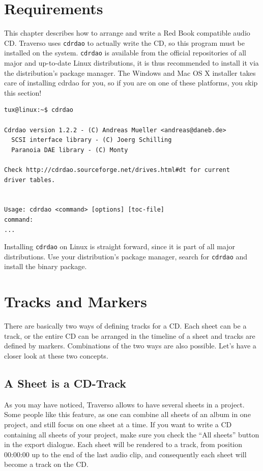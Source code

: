 \section{Requirements}
This chapter describes how to arrange and write a Red Book compatible audio CD. Traverso uses \texttt{cdrdao} to actually write the CD, so this program must be installed on the system. \texttt{cdrdao} is available from the official repositories of all  major and up-to-date Linux distributions, it is thus recommended to install it via the distribution's package manager. The Windows and Mac OS X installer takes care of installing cdrdao for you, so if you are on one of these platforms, you skip this section!

\footnotesize
\begin{verbatim}
tux@linux:~$ cdrdao

Cdrdao version 1.2.2 - (C) Andreas Mueller <andreas@daneb.de>
  SCSI interface library - (C) Joerg Schilling
  Paranoia DAE library - (C) Monty

Check http://cdrdao.sourceforge.net/drives.html#dt for current 
driver tables.


Usage: cdrdao <command> [options] [toc-file]
command:
...
\end{verbatim}
\normalsize

Installing \texttt{cdrdao} on Linux is straight forward, since it is part of all major distributions. Use your distribution's package manager, search for \texttt{cdrdao} and install the binary package.

\section{Tracks and Markers}
There are basically two ways of defining tracks for a CD. Each sheet can be a track, or the entire CD can be arranged in the timeline of a sheet and tracks are defined by markers. Combinations of the two ways are also possible. Let's have a closer look at these two concepts.

\subsection{A Sheet is a CD-Track}
As you may have noticed, Traverso allows to have several sheets in a project. Some people like this feature, as one can combine all sheets of an album in one project, and still focus on one sheet at a time. If you want to write a CD containing all sheets of your project, make sure you check the ``All sheets'' button in the export dialogue. Each sheet will be rendered to a track, from position 00:00:00 up to the end of the last audio clip, and consequently each sheet will become a track on the CD.

